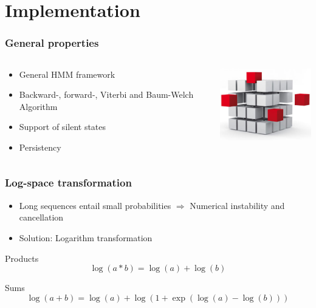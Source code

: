 \documentclass{beamer}[12pt]
\begin{document}
\section{Implementation}

\begin{frame}
	\frametitle{General properties}
	\begin{columns}
		\begin{column}{6cm}
			\begin{itemize}
				\item General HMM framework
				\item Backward-, forward-, Viterbi and Baum-Welch Algorithm
				\item Support of silent states
				\item Persistency
			\end{itemize}
		\end{column}
		\begin{column}{5cm}
			\includegraphics[width=4.5cm]{../picturesforthepresentation/features.jpg}
		\end{column}
	\end{columns}
\end{frame}

\begin{frame}
	\frametitle{Log-space transformation}
	\begin{itemize}
		\item Long sequences entail small probabilities $\Rightarrow$ Numerical instability and cancellation
		\item Solution: Logarithm transformation
	\end{itemize}
	\begin{block}{Products}
		\begin{displaymath}
			\log(a*b) = \log(a)+\log(b)
		\end{displaymath}
	\end{block}
	
	\begin{block}{Sums}
		\begin{displaymath}
			\log(a+b) = \log(a) + \log\left(1 + \exp\left(\log(a)-\log(b)\right)\right)
		\end{displaymath}
	\end{block}
\end{frame}
\end{document}
